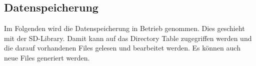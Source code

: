 \subsection{Datenspeicherung}
\label{sec:Inbetriebnahme_Datenspeicherung}

Im Folgenden wird die Datenspeicherung in Betrieb genommen. Dies geschieht mit der SD-Library. Damit kann auf das Directory Table zugegriffen werden und die darauf vorhandenen Files gelesen und bearbeitet werden. Es können auch neue Files generiert werden.